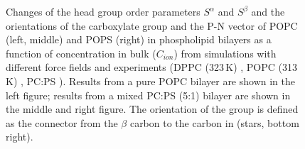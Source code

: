 \documentclass[12pt,a4paper,twoside,openright]{report}
\begin{document}
\begin{figure}[tb]
  \caption{ 
    Changes of the head group order parameters $S^\alpha$ and $S^\beta$ and the orientations of the carboxylate group and the P-N vector  
    of POPC (left, middle) and POPS (right) in phospholipid bilayers as a function of  concentration 
    in bulk ($C_{ion}$) from simulations with different force fields and experiments 
    (DPPC (323\,K) \citep{akutsu81}, POPC (313\,K) \citep{altenbach84}, PC:PS \citep{roux90}).  
    Results from a pure POPC bilayer are shown in the left figure;
    results from a mixed PC:PS (5:1) bilayer are shown in the middle and right figure.
    The orientation of the  group is defined as 
    the connector from the $\beta$ carbon to the carbon in  (stars, bottom right). 
  } 
\end{figure} 
\end{document}
